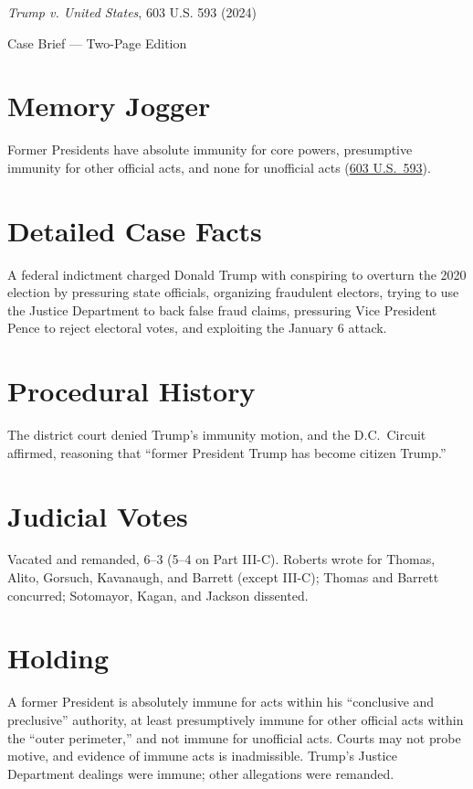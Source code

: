 \documentclass[12pt]{article}
\begin{document}
\begin{center}
{\LARGE \textit{Trump v. United States}, 603 U.S. 593 (2024)\par}
\vspace{0.5em}
{\large Case Brief --- Two-Page Edition\par}
\end{center}

\section{Memory Jogger}
Former Presidents have absolute immunity for core powers, presumptive immunity for other official acts, and none for unofficial acts (\href{https://www.law.cornell.edu/supremecourt/text/23-939}{603 U.S.\ 593}).

\section{Detailed Case Facts}
A federal indictment charged Donald Trump with conspiring to overturn the 2020 election by pressuring state officials, organizing fraudulent electors, trying to use the Justice Department to back false fraud claims, pressuring Vice President Pence to reject electoral votes, and exploiting the January 6 attack.

\section{Procedural History}
The district court denied Trump's immunity motion, and the D.C.\ Circuit affirmed, reasoning that ``former President Trump has become citizen Trump.''

\section{Judicial Votes}
Vacated and remanded, 6--3 (5--4 on Part III-C). Roberts wrote for Thomas, Alito, Gorsuch, Kavanaugh, and Barrett (except III-C); Thomas and Barrett concurred; Sotomayor, Kagan, and Jackson dissented.

\section{Holding}
A former President is absolutely immune for acts within his ``conclusive and preclusive'' authority, at least presumptively immune for other official acts within the ``outer perimeter,'' and not immune for unofficial acts. Courts may not probe motive, and evidence of immune acts is inadmissible. Trump's Justice Department dealings were immune; other allegations were remanded.
\end{document}
